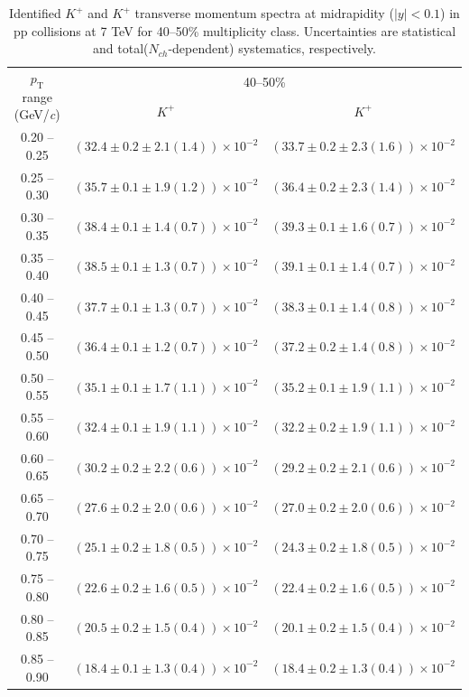 \begin{table}
\caption{Identified $K^{+}$ and $K^{+}$  transverse momentum spectra at midrapidity ($|y|<0.1$) in pp collisions at 7 TeV for 40--50\% multiplicity class. Uncertainties are statistical and total($N_{ch}$-dependent) systematics, respectively.}
\label{tab:KaonPlus_KaonMinus_40to50}
\begin{center}
\begin{tabular}{ c | c c }
\hline
\multirow{2}{*}{$p_{\mathrm{T}}$ range (GeV/\textit{c})} & \multicolumn{2}{c}{40--50\%} \\ & $K^{+}$& $K^{+}$\\ 
\hline
0.20 -- 0.25 & $(32.4\pm0.2\pm2.1(1.4))\times10^{-2}$ & $(33.7\pm0.2\pm2.3(1.6))\times10^{-2}$ \\ 
0.25 -- 0.30 & $(35.7\pm0.1\pm1.9(1.2))\times10^{-2}$ & $(36.4\pm0.2\pm2.3(1.4))\times10^{-2}$ \\ 
0.30 -- 0.35 & $(38.4\pm0.1\pm1.4(0.7))\times10^{-2}$ & $(39.3\pm0.1\pm1.6(0.7))\times10^{-2}$ \\ 
0.35 -- 0.40 & $(38.5\pm0.1\pm1.3(0.7))\times10^{-2}$ & $(39.1\pm0.1\pm1.4(0.7))\times10^{-2}$ \\ 
0.40 -- 0.45 & $(37.7\pm0.1\pm1.3(0.7))\times10^{-2}$ & $(38.3\pm0.1\pm1.4(0.8))\times10^{-2}$ \\ 
0.45 -- 0.50 & $(36.4\pm0.1\pm1.2(0.7))\times10^{-2}$ & $(37.2\pm0.2\pm1.4(0.8))\times10^{-2}$ \\ 
0.50 -- 0.55 & $(35.1\pm0.1\pm1.7(1.1))\times10^{-2}$ & $(35.2\pm0.1\pm1.9(1.1))\times10^{-2}$ \\ 
0.55 -- 0.60 & $(32.4\pm0.1\pm1.9(1.1))\times10^{-2}$ & $(32.2\pm0.2\pm1.9(1.1))\times10^{-2}$ \\ 
0.60 -- 0.65 & $(30.2\pm0.2\pm2.2(0.6))\times10^{-2}$ & $(29.2\pm0.2\pm2.1(0.6))\times10^{-2}$ \\ 
0.65 -- 0.70 & $(27.6\pm0.2\pm2.0(0.6))\times10^{-2}$ & $(27.0\pm0.2\pm2.0(0.6))\times10^{-2}$ \\ 
0.70 -- 0.75 & $(25.1\pm0.2\pm1.8(0.5))\times10^{-2}$ & $(24.3\pm0.2\pm1.8(0.5))\times10^{-2}$ \\ 
0.75 -- 0.80 & $(22.6\pm0.2\pm1.6(0.5))\times10^{-2}$ & $(22.4\pm0.2\pm1.6(0.5))\times10^{-2}$ \\ 
0.80 -- 0.85 & $(20.5\pm0.2\pm1.5(0.4))\times10^{-2}$ & $(20.1\pm0.2\pm1.5(0.4))\times10^{-2}$ \\ 
0.85 -- 0.90 & $(18.4\pm0.1\pm1.3(0.4))\times10^{-2}$ & $(18.4\pm0.2\pm1.3(0.4))\times10^{-2}$ \\ 

\end{tabular}
\end{center}
\end{table}
